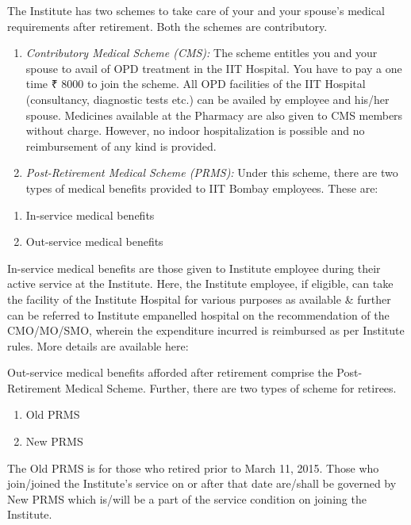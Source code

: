 \documentclass[
  10pt,
  a5paper,
  10pt,
  openany]{amsbook}
\providecommand{\tightlist}{%
  \setlength{\itemsep}{0pt}\setlength{\parskip}{0pt}}
\begin{document}
The Institute has two schemes to take care of your and your spouse's
medical requirements after retirement. Both the schemes are
contributory.

\begin{enumerate}
\def\labelenumi{\arabic{enumi}.}
\tightlist
\item
  \emph{Contributory Medical Scheme (CMS):} The scheme entitles you and
  your spouse to avail of OPD treatment in the IIT Hospital. You have to
  pay a one time ₹ 8000 to join the scheme. All OPD facilities of the
  IIT Hospital (consultancy, diagnostic tests etc.) can be availed by
  employee and his/her spouse. Medicines available at the Pharmacy are
  also given to CMS members without charge. However, no indoor
  hospitalization is possible and no reimbursement of any kind is
  provided.
\item
  \emph{Post-Retirement Medical Scheme (PRMS):} Under this scheme, there
  are two types of medical benefits provided to IIT Bombay employees.
  These are:
\end{enumerate}

\begin{enumerate}
\def\labelenumi{\alph{enumi})}
\tightlist
\item
  In-service medical benefits
\item
  Out-service medical benefits
\end{enumerate}

In-service medical benefits are those given to Institute employee during
their active service at the Institute. Here, the Institute employee, if
eligible, can take the facility of the Institute Hospital for various
purposes as available \& further can be referred to Institute empanelled
hospital on the recommendation of the CMO/MO/SMO, wherein the
expenditure incurred is reimbursed as per Institute rules. More details
are available here:

Out-service medical benefits afforded after retirement comprise the
Post-Retirement Medical Scheme. Further, there are two types of scheme
for retirees.

\begin{enumerate}
\def\labelenumi{\alph{enumi}.}
\tightlist
\item
  Old PRMS
\item
  New PRMS
\end{enumerate}

The Old PRMS is for those who retired prior to March 11, 2015. Those who
join/joined the Institute's service on or after that date are/shall be
governed by New PRMS which is/will be a part of the service condition on
joining the Institute.
\end{document}
